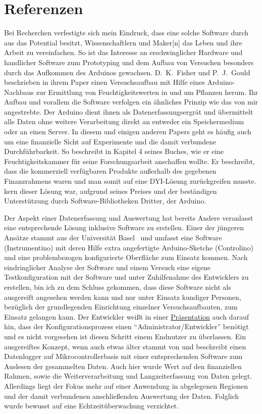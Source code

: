 \section{Referenzen}
Bei Recherchen verfestigte sich mein Eindruck, dass eine solche Software durch aus das Potential besitzt, Wissenschaftlern und \gls{Maker}[n] das Leben und ihre Arbeit zu vereinfachen. So ist das Interesse an erschwinglicher Hardware und handlicher 
Software zum Prototyping und dem Aufbau von Versuchen besonders durch das 
Aufkommen des Arduinos gewachsen. D.~K.~Fisher und P.~J.~Gould~\cite{ModernInstrumentation} beschrieben in ihrem Paper einen 
Versuchsaufbau mit Hilfe eines Arduino-Nachbaus zur Ermittlung von 
Feuchtigkeitswerten in und um Pflanzen herum. Ihr Aufbau und vorallem die 
Software verfolgen ein ähnliches Prinzip wie das von mir angestrebte. Der 
Arduino dient ihnen als Datenerfassungsergrät und übermittelt alle Daten ohne 
weitere Verarbeitung direkt an entweder ein Speichermedium oder an einen 
Server. In diesem und einigen anderen Papers geht es häufig auch um eine finanzielle Sicht auf Experimente und die damit verbundene Durchführbarkeit. So beschreibt \citet{joshua_m._pearce_open-source_2014} in Kapitel 4 seines Buches, wie er eine Feuchtigkeitskammer für seine Forschungsarbeit anschaffen wollte. Er beschreibt, dass die kommerziell verfügbaren Produkte außerhalb des gegebenen Finanzrahmens waren und man somit auf eine \acrshort{DYI}-Lösung zurückgreifen musste. kern dieser Lösung war, aufgrund seines Preises und der beständigen Unterstützung durch Software-Bibliotheken Dritter, der Arduino.

Der Aspekt einer Datenerfassung und Auswertung hat bereits Andere veranlasst 
eine entsprechende Lösung inklusive Software zu erstellen. Einer der jüngeren Ansätze stammt 
aus der Universität Basel~\cite{Instrumentino} und umfasst eine Software 
(Instrumentino) mit deren Hilfe extra angefertigte Arduino-Sketche (Controlino) 
und eine problembezogen konfigurierte Oberfläche zum Einsatz kommen. 
Nach eindringlicher Analyse der Software und einem Versuch eine eigene 
Testkonfiguration mit der Software und unter Zuhilfenahme des Entwicklers zu erstellen, bin 
ich zu dem Schluss gekommen, dass diese Software nicht als ausgereift angesehen 
werden kann und nur unter Einsatz kundiger Personen, bezüglich der grundlegenden Einrichtung einzelner Versuchsaufbauten, zum Einsatz gelangen kann. Der Entwickler weißt in einer 
\href{https://github.com/yoelk/Instrumentino/blob/master/documents/Instrumentino\%20presentation.pptx}{Präsentation} auch darauf hin, dass der Konfigurationsprozess einen "`Administrator/Entwickler"' benötigt und es nicht vorgesehen ist diesen Schritt einem Endnutzer zu überlassen. 
Ein ausgereiftes Konzept, wenn auch etwas älter stammt von \citet{dedrick_inexpensive_2000} und beschreibt einen Datenlogger auf Mikrocontrollerbasis mit einer entsprechenden Software zum Auslesen der gesammelten Daten. Auch hier wurde Wert auf den finanziellen Rahmen, sowie die Weiterverarbeitung und Langzeiterfassung von Daten gelegt. Allerdings liegt der Fokus mehr auf einer Anwendung in abgelegenen Regionen und der damit verbundenen anschließenden Auswertung der Daten. Folglich wurde bewusst auf eine Echtzeitüberwachung verzichtet.